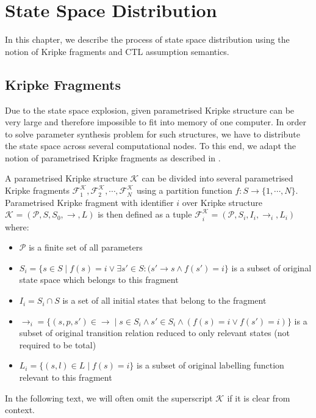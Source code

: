 \documentclass[12pt,oneside]{fithesis2}
\newcommand{\ks}[1][]{\ensuremath{\mathcal{K}_{#1}}}
\newcommand{\kf}[2]{\ensuremath{\mathcal{F}^{#2}_{#1}}}
\newcommand{\fullKs}{\ensuremath{ \ks = (\params, S, S_0, \trans{}, L) }}
\newcommand{\fullKf}[2]{\ensuremath{ \kf{#1}{#2} = (\params, S_{#1}, I_{i}, \trans{}_{#1}, L_{#1}) }}
\newcommand{\trans}[1]{\stackrel{#1}{\rightarrow}}
\newcommand{\params}{\mathcal{P}}
\begin{document}
	\chapter{State Space Distribution}
		
		In this chapter, we describe the process of state space distribution using the notion of Kripke fragments and CTL assumption semantics. 
				
		\section{Kripke Fragments}
		
			Due to the state space explosion, given parametrised Kripke structure can be very large and therefore impossible to fit into memory of one computer. In order to solve parameter synthesis problem for such structures, we have to distribute the state space across several computational nodes. To this end, we adapt the notion of par\-am\-etrised Kripke fragments as described in \cite{assumptions}.
			
			A parametrised Kripke structure $\ks$ can be divided into several parametrised Kripke fragments $\kf{1}{\ks}, \kf{2}{\ks}, \cdots , \kf{N}{\ks}$ using a partition function $f : S \rightarrow \{1, \cdots , N \}$. Parametrised Kripke fragment with identifier $i$ over Kripke structure $\fullKs$ is then defined as a tuple $\fullKf{i}{\ks}$ where:
			
			\begin{itemize}
				\item $\params$ is a finite set of all parameters
				\item $S_{i} = \{ s \in S \mid f(s) = i \vee \exists s'\in S : (s' \trans{} s \wedge f(s') = i \}$ is a subset of original state space which belongs to this fragment
				\item $I_{i} = S_i \cap S $ is a set of all initial states that belong to the fragment
				\item $\trans{}_{i} = \{ (s, p, s') \in \trans{} \mid s \in S_{i} \wedge s' \in S_{i} \wedge (f(s) = i \vee f(s') = i) \}$ is a subset of original transition relation reduced to only relevant states (not required to be total)
				\item $L_{i} = \{ (s, l) \in L \mid f(s) = i \}$ is a subset of original labelling function relevant to this fragment
			\end{itemize}
						
			In the following text, we will often omit the superscript $\ks$ if it is clear from context.
						
\end{document}
